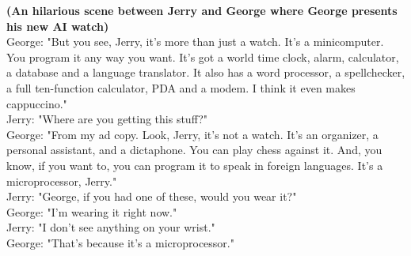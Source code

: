 \documentclass[11pt]{article}
\begin{document}
\begin{framed}
\centering
\vspace{.5em}
\begin{minipage}{.9\textwidth}
\textbf{(An hilarious scene between Jerry and George where George presents his new AI watch)}\\
George: "But you see, Jerry, it's more than just a watch. It's a minicomputer. You program it any way you want. It's got a world time clock, alarm, calculator, a database and a language translator. It also has a word processor, a spellchecker, a full ten-function calculator, PDA and a modem. I think it even makes cappuccino."\\
Jerry: "Where are you getting this stuff?"\\
George: "From my ad copy. Look, Jerry, it's not a watch. It's an organizer, a personal assistant, and a dictaphone. You can play chess against it. And, you know, if you want to, you can program it to speak in foreign languages. It's a microprocessor, Jerry."\\
Jerry: "George, if you had one of these, would you wear it?"\\
George: "I'm wearing it right now."\\
Jerry: "I don't see anything on your wrist."\\
George: "That's because it's a microprocessor."
        \end{minipage}
\vspace{.5em}
\end{framed}
\end{document}

